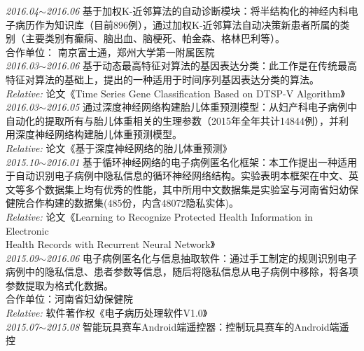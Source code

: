 \documentclass[line, margin]{res}
\newcommand{\xiaowu}{\fontsize{9pt}{15.75pt}\selectfont} %
\begin{document}
\begin{resume}
 { 
 {\sl 2016.04$\sim$2016.06} 基于加权K-近邻算法的自动诊断模块：{ 将半结构化的神经内科电\\
 子病历作为知识库（目前896例），通过加权K-近邻算法自动决策新患者所属的类\\
 别（主要类别有癫痫、脑出血、脑梗死、帕金森、格林巴利等）。\\
 {\xiaowu 合作单位： 南京富士通，郑州大学第一附属医院} }\\
[7pt] 
 {\sl 2016.03$\sim$2016.06} 基于动态最高特征对算法的基因表达分类：{ 此工作是在传统最高\\
 特征对算法的基础上，提出的一种适用于时间序列基因表达分类的算法。}\\
 {\sl\xiaowu Relative:} {\xiaowu 论文《Time Series Gene Classification Based on DTSP-V Algorithm》}\\
[7pt] 
 {\sl 2016.03$\sim$2016.05} 通过深度神经网络构建胎儿体重预测模型：{ 从妇产科电子病例中\\
 自动化的提取所有与胎儿体重相关的生理参数（2015年全年共计14844例），并利\\
 用深度神经网络构建胎儿体重预测模型。} \\
 {\sl\xiaowu Relative:} {\xiaowu 论文《基于深度神经网络的胎儿体重预测》} \\
[7pt]
 {\sl 2015.10$\sim$2016.01} 基于循环神经网络的电子病例匿名化框架：{ 本工作提出一种适用\\
 于自动识别电子病例中隐私信息的循环神经网络结构。实验表明本框架在中文、英\\
 文等多个数据集上均有优秀的性能，其中所用中文数据集是实验室与河南省妇幼保\\
 健院合作构建的数据集(485份，内含48072隐私实体)。} \\
 {\sl\xiaowu Relative:} {\xiaowu 论文《Learning to Recognize Protected Health Information in  Electronic \\
 Health Records with Recurrent Neural Network》}\\
[7pt] 
 {\sl 2015.09$\sim$2016.06} 电子病例匿名化与信息抽取软件：{ 通过手工制定的规则识别电子\\
 病例中的隐私信息、患者参数等信息，随后将隐私信息从电子病例中移除，将各项\\
 参数提取为格式化数据。\\
 {\xiaowu 合作单位：河南省妇幼保健院} } \\
 {\sl\xiaowu Relative:} {\xiaowu 软件著作权《电子病历处理软件V1.0》} \\
[7pt]
 {\sl 2015.07$\sim$2015.08} 智能玩具赛车Android端遥控器：{ 控制玩具赛车的Android端遥控\\
}}
\end{resume}
\end{document}
